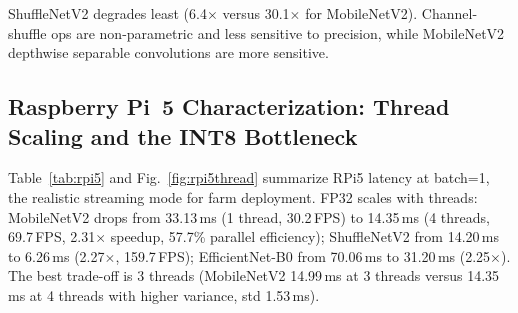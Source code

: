 \documentclass[conference,a4paper]{IEEEtran}
\begin{document}
ShuffleNetV2 degrades least (6.4$\times$ versus 30.1$\times$ for MobileNetV2). Channel-shuffle ops are non-parametric and less sensitive to precision, while MobileNetV2 depthwise separable convolutions are more sensitive.

\subsection{Raspberry Pi~5 Characterization: Thread Scaling and the INT8 Bottleneck}
Table~\ref{tab:rpi5} and Fig.~\ref{fig:rpi5thread} summarize RPi5 latency at batch=1, the realistic streaming mode for farm deployment. FP32 scales with threads: MobileNetV2 drops from 33.13\,ms (1 thread, 30.2\,FPS) to 14.35\,ms (4 threads, 69.7\,FPS, 2.31$\times$ speedup, 57.7\% parallel efficiency); ShuffleNetV2 from 14.20\,ms to 6.26\,ms (2.27$\times$, 159.7\,FPS); EfficientNet-B0 from 70.06\,ms to 31.20\,ms (2.25$\times$). The best trade-off is 3 threads (MobileNetV2 14.99\,ms at 3 threads versus 14.35\,ms at 4 threads with higher variance, std 1.53\,ms).

\begin{table}[htbp]
\caption{RPi5 latency, batch=1 (mean of 200 runs, P50 in parentheses). 44--58$^{\circ}$C, throttled=0x0; std $<$1.6\,ms except 4-thread tails.}
\label{tab:rpi5}
\centering
\footnotesize
\setlength{\tabcolsep}{3.2pt}
\end{table}
\end{document}
